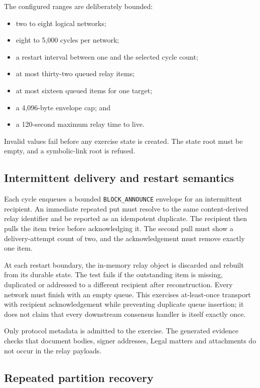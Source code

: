 The configured ranges are deliberately bounded:

\begin{itemize}
  \item two to eight logical networks;
  \item eight to 5,000 cycles per network;
  \item a restart interval between one and the selected cycle count;
  \item at most thirty-two queued relay items;
  \item at most sixteen queued items for one target;
  \item a 4,096-byte envelope cap; and
  \item a 120-second maximum relay time to live.
\end{itemize}

Invalid values fail before any exercise state is created.  The state root must
be empty, and a symbolic-link root is refused.

\subsection{Intermittent delivery and restart semantics}

Each cycle enqueues a bounded \texttt{BLOCK\_ANNOUNCE} envelope for an
intermittent recipient.  An immediate repeated put must resolve to the same
content-derived relay identifier and be reported as an idempotent duplicate.
The recipient then pulls the item twice before acknowledging it.  The second
pull must show a delivery-attempt count of two, and the acknowledgement must
remove exactly one item.

At each restart boundary, the in-memory relay object is discarded and rebuilt
from its durable state.  The test fails if the outstanding item is missing,
duplicated or addressed to a different recipient after reconstruction.  Every
network must finish with an empty queue.  This exercises at-least-once transport
with recipient acknowledgement while preventing duplicate queue insertion; it
does not claim that every downstream consensus handler is itself exactly once.

Only protocol metadata is admitted to the exercise.  The generated evidence
checks that document bodies, signer addresses, Legal matters and attachments do
not occur in the relay payloads.

\subsection{Repeated partition recovery}


